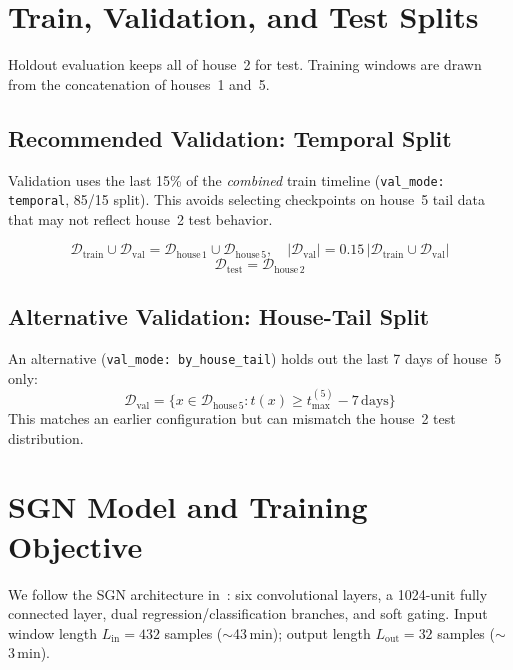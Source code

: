 \documentclass[conference]{IEEEtran}
\begin{document}
\section{Train, Validation, and Test Splits}
Holdout evaluation keeps all of house~2 for test.
Training windows are drawn from the concatenation of houses~1 and~5.

\subsection{Recommended Validation: Temporal Split}
Validation uses the last 15\% of the \emph{combined} train timeline (\texttt{val\_mode: temporal}, 85/15 split).
This avoids selecting checkpoints on house~5 tail data that may not reflect house~2 test behavior.

\begin{equation}
\mathcal{D}_{\mathrm{train}} \cup \mathcal{D}_{\mathrm{val}} = \mathcal{D}_{\mathrm{house\,1}} \cup \mathcal{D}_{\mathrm{house\,5}}, \quad
|\mathcal{D}_{\mathrm{val}}| = 0.15\,|\mathcal{D}_{\mathrm{train}} \cup \mathcal{D}_{\mathrm{val}}|
\end{equation}
\begin{equation}
\mathcal{D}_{\mathrm{test}} = \mathcal{D}_{\mathrm{house\,2}}
\end{equation}

\subsection{Alternative Validation: House-Tail Split}
An alternative (\texttt{val\_mode: by\_house\_tail}) holds out the last 7 days of house~5 only:
\begin{equation}
\mathcal{D}_{\mathrm{val}} = \{ x \in \mathcal{D}_{\mathrm{house\,5}} : t(x) \geq t_{\max}^{(5)} - 7\,\mathrm{days} \}
\end{equation}
This matches an earlier configuration but can mismatch the house~2 test distribution.

\section{SGN Model and Training Objective}
We follow the SGN architecture in~\cite{shin2019sgn}: six convolutional layers, a 1024-unit fully connected layer, dual regression/classification branches, and soft gating.
Input window length $L_{\mathrm{in}} = 432$ samples ($\sim$43\,min); output length $L_{\mathrm{out}} = 32$ samples ($\sim$3\,min).
\end{document}
